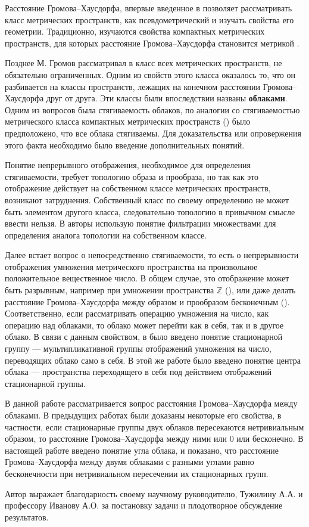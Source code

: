 Расстояние Громова--Хаусдорфа, впервые введенное в \cite{Edwards} позволяет
рассматривать класс метрических пространств, как псевдометрический и изучать
свойства его геометрии. Традиционно, изучаются свойства компактных
метрических пространств, для которых расстояние Громова--Хаусдорфа становится
метрикой \cite{gromov_structures_1981}.

Позднее М. Громов рассматривал в \cite{gromov_metric_2001} класс всех метрических
пространств, не обязательно ограниченных. Одним из свойств этого класса
оказалось то, что он разбивается на классы пространств, лежащих на конечном
расстоянии Громова--Хаусдорфа друг от друга. Эти классы были впоследствии
названы \textbf{облаками}. Одним из вопросов была стягиваемость облаков, по
аналогии со стягиваемостью метрического класса компактных метрических
пространств (\cite{gromov_structures_1981}) было предположено, что все облака
стягиваемы. Для доказательства или опровержения этого факта необходимо было
введение дополнительных понятий.

Понятие непрерывного отображения, необходимое для определения стягиваемости,
требует топологию образа и прообраза, но так как это отображение действует на
собственном классе метрических пространств, возникают затруднения.
Собственный класс по своему определению не может быть элементом другого
класса, следовательно топологию в привычном смысле ввести нельзя. В \cite{borzov_extendability_2020}
 авторы использую понятие фильтрации
множествами для определения аналога топологии на собственном классе.

Далее встает вопрос о непосредственно стягиваемости, то есть о непрерывности
отображения умножения метрического пространства на произвольное положительное
вещественное число. В общем случае, это отображение может быть разрывным,
например при умножении пространства \( \mathbb{Z} \)
(\cite{mikhailov2025newgeodesiclinesgromovhausdorff}), или даже делать
расстояние Громова--Хаусдорфа между образом и прообразом бесконечным
(\cite{TuzhBog1}). Соответственно, если рассматривать операцию умножения на
число, как операцию над облаками, то облако может перейти как в себя, так и в
другое облако. В связи с данным свойством, в \cite{TuzhBog2} было введено
понятие стационарной группу --- мультипликативной группы отображений
умножения на число, переводящих облако само в себя. В этой же работе было
введено понятие центра облака --- пространства переходящего в себя под
действием отображений стационарной группы.

В данной работе рассматривается вопрос расстояния Громова--Хаусдорфа между облаками. В предыдущих работах были доказаны некоторые его свойства, в частности, если стационарные группы двух облаков пересекаются нетривиальным образом, то расстояние Громова--Хаусдорфа между ними или \( 0 \) или бесконечно. В настоящей работе введено понятие угла облака, и показано, что расстояние Громова--Хаусдорфа между двумя облаками с разными углами равно бесконечности при нетривиальном пересечении их стационарных групп.

Автор выражает благодарность своему научному руководителю, Тужилину А.А. и профессору Иванову А.О. за постановку задачи и плодотворное обсуждение результатов.



